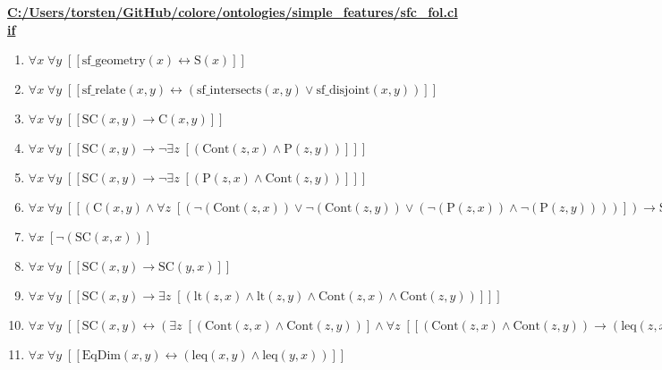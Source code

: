 \documentclass{article}
\begin{document}
\textbf{\url{C:/Users/torsten/GitHub/colore/ontologies/simple\_features/sfc\_fol.clif}}

\begin{enumerate}
\item $\forall x\; \forall y\;  \left[ \left[ \textrm{sf\_geometry}(x) \leftrightarrow \textrm{S}(x) \right] \right]$
\item $\forall x\; \forall y\;  \left[ \left[ \textrm{sf\_relate}(x,y) \leftrightarrow \left(\textrm{sf\_intersects}(x,y) \lor \textrm{sf\_disjoint}(x,y)\right) \right] \right]$
\item $\forall x\; \forall y\;  \left[ \left[ \textrm{SC}(x,y) \rightarrow \textrm{C}(x,y) \right] \right]$
\item $\forall x\; \forall y\;  \left[ \left[ \textrm{SC}(x,y) \rightarrow \neg \exists z\;  \left[ \left(\textrm{Cont}(z,x) \land \textrm{P}(z,y)\right) \right] \right] \right]$
\item $\forall x\; \forall y\;  \left[ \left[ \textrm{SC}(x,y) \rightarrow \neg \exists z\;  \left[ \left(\textrm{P}(z,x) \land \textrm{Cont}(z,y)\right) \right] \right] \right]$
\item $\forall x\; \forall y\;  \left[ \left[ \left(\textrm{C}(x,y) \land \forall z\;  \left[ \left(\neg \left(\textrm{Cont}(z,x)\right) \lor \neg \left(\textrm{Cont}(z,y)\right) \lor \left(\neg \left(\textrm{P}(z,x)\right) \land \neg \left(\textrm{P}(z,y)\right)\right)\right) \right]\right) \rightarrow \textrm{SC}(x,y) \right] \right]$
\item $\forall x\;  \left[ \neg \left(\textrm{SC}(x,x)\right) \right]$
\item $\forall x\; \forall y\;  \left[ \left[ \textrm{SC}(x,y) \rightarrow \textrm{SC}(y,x) \right] \right]$
\item $\forall x\; \forall y\;  \left[ \left[ \textrm{SC}(x,y) \rightarrow \exists z\;  \left[ \left(\textrm{lt}(z,x) \land \textrm{lt}(z,y) \land \textrm{Cont}(z,x) \land \textrm{Cont}(z,y)\right) \right] \right] \right]$
\item $\forall x\; \forall y\;  \left[ \left[ \textrm{SC}(x,y) \leftrightarrow \left(\exists z\;  \left[ \left(\textrm{Cont}(z,x) \land \textrm{Cont}(z,y)\right) \right] \land \forall z\;  \left[ \left[ \left(\textrm{Cont}(z,x) \land \textrm{Cont}(z,y)\right) \rightarrow \left(\textrm{leq}(z,x) \land \neg \left(\textrm{EqDim}(z,x)\right) \land \textrm{leq}(z,y) \land \neg \left(\textrm{EqDim}(z,y)\right)\right) \right] \right]\right) \right] \right]$
\item $\forall x\; \forall y\;  \left[ \left[ \textrm{EqDim}(x,y) \leftrightarrow \left(\textrm{leq}(x,y) \land \textrm{leq}(y,x)\right) \right] \right]$

\end{enumerate}
\end{document}
